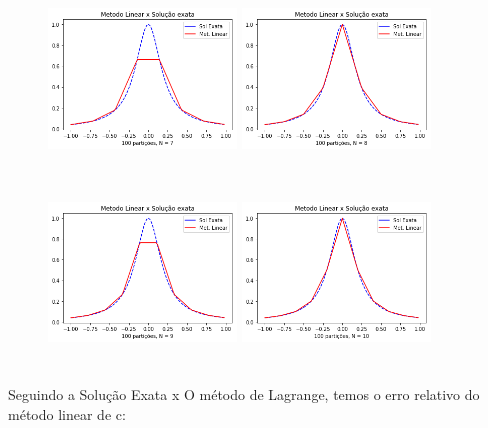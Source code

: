 \documentclass{article}
\begin{document}
\begin{figure}[!htb]
\includegraphics [width=5cm,height=5cm]{LSEc7.png}
\includegraphics [width=5cm,height=5cm]{LSEc8.png}
\includegraphics [width=5cm,height=5cm]{LSEc9.png}
\includegraphics [width=5cm,height=5cm]{LSEc10.png}
\end{figure}

\newpage

\text Seguindo a Solução Exata x O método de Lagrange, temos o erro relativo do método linear de c:
\end{document}
